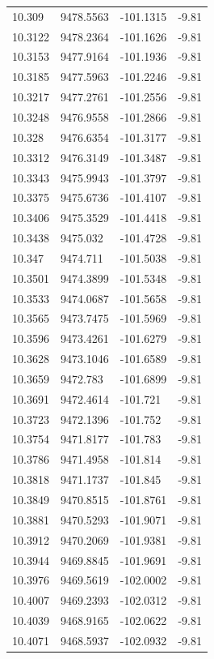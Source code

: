 \begin{table}[H]
\begin{tabular}{llll}
10.309 & 9478.5563 & -101.1315 & -9.81 \\
10.3122 & 9478.2364 & -101.1626 & -9.81 \\
10.3153 & 9477.9164 & -101.1936 & -9.81 \\
10.3185 & 9477.5963 & -101.2246 & -9.81 \\
10.3217 & 9477.2761 & -101.2556 & -9.81 \\
10.3248 & 9476.9558 & -101.2866 & -9.81 \\
10.328 & 9476.6354 & -101.3177 & -9.81 \\
10.3312 & 9476.3149 & -101.3487 & -9.81 \\
10.3343 & 9475.9943 & -101.3797 & -9.81 \\
10.3375 & 9475.6736 & -101.4107 & -9.81 \\
10.3406 & 9475.3529 & -101.4418 & -9.81 \\
10.3438 & 9475.032 & -101.4728 & -9.81 \\
10.347 & 9474.711 & -101.5038 & -9.81 \\
10.3501 & 9474.3899 & -101.5348 & -9.81 \\
10.3533 & 9474.0687 & -101.5658 & -9.81 \\
10.3565 & 9473.7475 & -101.5969 & -9.81 \\
10.3596 & 9473.4261 & -101.6279 & -9.81 \\
10.3628 & 9473.1046 & -101.6589 & -9.81 \\
10.3659 & 9472.783 & -101.6899 & -9.81 \\
10.3691 & 9472.4614 & -101.721 & -9.81 \\
10.3723 & 9472.1396 & -101.752 & -9.81 \\
10.3754 & 9471.8177 & -101.783 & -9.81 \\
10.3786 & 9471.4958 & -101.814 & -9.81 \\
10.3818 & 9471.1737 & -101.845 & -9.81 \\
10.3849 & 9470.8515 & -101.8761 & -9.81 \\
10.3881 & 9470.5293 & -101.9071 & -9.81 \\
10.3912 & 9470.2069 & -101.9381 & -9.81 \\
10.3944 & 9469.8845 & -101.9691 & -9.81 \\
10.3976 & 9469.5619 & -102.0002 & -9.81 \\
10.4007 & 9469.2393 & -102.0312 & -9.81 \\
10.4039 & 9468.9165 & -102.0622 & -9.81 \\
10.4071 & 9468.5937 & -102.0932 & -9.81 \\

\end{tabular}
\end{table}
